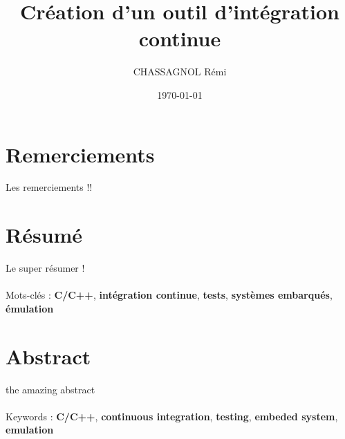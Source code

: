 \documentclass[a4paper]{article}
\title{Création d'un outil d'intégration continue}
\author{CHASSAGNOL Rémi}
\date{\today}
\begin{document}

\clearpage{}

\thispagestyle{empty}
\tableofcontents
\clearpage{}

\section*{Remerciements}
\thispagestyle{empty}

\doublespacing

Les remerciements !!

\onehalfspacing

\clearpage{}

\listoffigures
\clearpage{}

\section*{Résumé}

Le super résumer !
\\~\\

\noindent
Mots-clés : \textbf{C/C++}, \textbf{intégration continue}, \textbf{tests},
\textbf{systèmes embarqués}, \textbf{émulation}

\section*{Abstract}

the amazing abstract
\\~\\

\noindent
Keywords : \textbf{C/C++}, \textbf{continuous integration}, \textbf{testing},
\textbf{embeded system}, \textbf{emulation}
\end{document}
